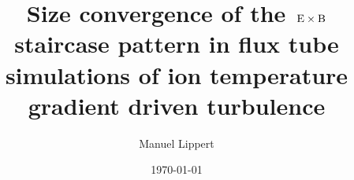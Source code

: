 \titlehead{
    \centering
    \texttt{[image: Uni\_Logo\_white\_black.png]}
}

\subject{\normalfont Bachelor Thesis}
\title{Size convergence of the $\mathbf{\mathrm{\:E}\times\mathrm{B}}$ staircase pattern in flux tube simulations of ion temperature gradient driven turbulence}
\author{Manuel Lippert}
\date{\today}
\publishers{\textbf{Instuitut for Theoretical Plasma Physics}\\
\vspace*{2em}
Supervisors:\\
Prof.\,Arthur\,G.\,Peeters\\
Dr.\,Florian\,Rath}